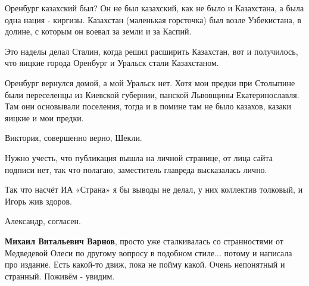 \begin{itemize}
\begin{itemize}
Оренбург казахский был? \Smiley[1.0][yellow]Он не был казахский, как не было и Казахстана, а была
одна нация - киргизы. Казахстан (маленькая горсточка) был возле Узбекистана, в
долине, с которым он воевал за земли и за Каспий. 

Это наделы делал Сталин, когда решил расширить Казахстан, вот и получилось, что
яицкие города Оренбург и Уральск стали Казахстаном. 

Оренбург вернулся домой, а мой Уральск нет. Хотя мои предки при Столыпине были
переселенцы из Киевской губернии, панской Львовщины Екатеринославля. Там они
основывали поселения, тогда и в помине там не было казахов, казаки яицкие и мои
предки.

 

Виктория, совершенно верно, Шекли.

Нужно учесть, что публикация вышла на личной странице, от лица сайта подписи
нет, так что полагаю, заместитель главреда высказалась лично.

Так что насчёт ИА «Страна» я бы выводы не делал, у них коллектив толковый, и
Игорь жив здоров.


 

Александр, согласен.

 

\textbf{Михаил Витальевич Варнов}, просто уже сталкивалась со странностями от
Медведевой Олеси по другому вопросу в подобном стиле... потому и написала про
издание. Есть какой-то движ, пока не пойму какой. Очень непонятный и странный.
Поживём - увидим.

 

\end{itemize}
\end{itemize}
